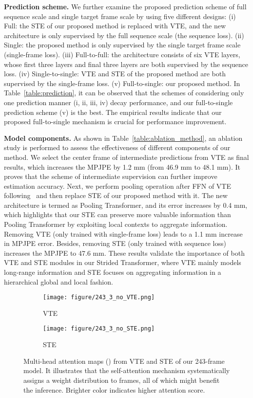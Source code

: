 \documentclass[journal]{IEEEtran}
\begin{document}
\textbf{Prediction scheme.}
We further examine the proposed prediction scheme of full sequence scale and single target frame scale by using five different designs: 
(i) Full: the STE of our proposed method is replaced with VTE, and the new architecture is only supervised by the full sequence scale (the sequence loss). 
(ii) Single: the proposed method is only supervised by the single target frame scale (single-frame loss). 
(iii) Full-to-full: the architecture consists of six VTE layers, whose first three layers and final three layers are both supervised by the sequence loss. 
(iv) Single-to-single: VTE and STE of the proposed method are both supervised by the single-frame loss.
(v) Full-to-single: our proposed method. 
In Table~\ref{table:prediction}, it can be observed that the schemes of considering only one prediction manner (i, ii, iii, iv) decay performance, and our full-to-single prediction scheme (v) is the best. 
The empirical results indicate that our proposed full-to-single mechanism is crucial for performance improvement. 

\textbf{Model components.}
As shown in Table~\ref{table:ablation_method}, an ablation study is performed to assess the effectiveness of different components of our method. 
We select the center frame of intermediate predictions from VTE as final results, which increases the 
MPJPE by 1.2 mm (from 46.9 mm to 48.1 mm). 
It proves that the scheme of intermediate supervision can further improve estimation accuracy. 
Next, we perform pooling operation after FFN of VTE following~\cite{zihang2020funnel-transformer} and then replace STE of our proposed method with it. 
The new architecture is termed as Pooling Transformer, and its error increases by 0.4 mm, which highlights that our STE can preserve more valuable information than Pooling Transformer by exploiting local contexts to aggregate information. 
Removing VTE (only trained with single-frame loss) leads to a 1.1 mm increase in MPJPE error. 
Besides, removing STE (only trained with sequence loss) increases the MPJPE to 47.6 mm. 
These results validate the importance of both VTE and STE modules in our Strided Transformer, where VTE mainly models long-range information and STE focuses on aggregating information in a hierarchical global and local fashion. 

\begin{figure*}[htb]
   \centering
   \begin{subfigure}[htb]{0.497\textwidth}
      \texttt{[image: figure/243\_3\_no\_VTE.png]}
      \caption{VTE}
      \label{fig:attetion_VTE}
   \end{subfigure}
   \begin{subfigure}[htb]{0.497\textwidth}
      \texttt{[image: figure/243\_3\_no\_STE.png]}
      \caption{STE}
      \label{fig:attetion_STE}
   \end{subfigure}
   \caption
   {
      Multi-head attention maps () from VTE and STE of our 243-frame model. 
      It illustrates that the self-attention mechanism systematically assigns a weight distribution to frames, all of which might benefit the inference. 
      Brighter color indicates higher attention score. 
   }
   \label{fig:attention}
\end{figure*}
\end{document}
